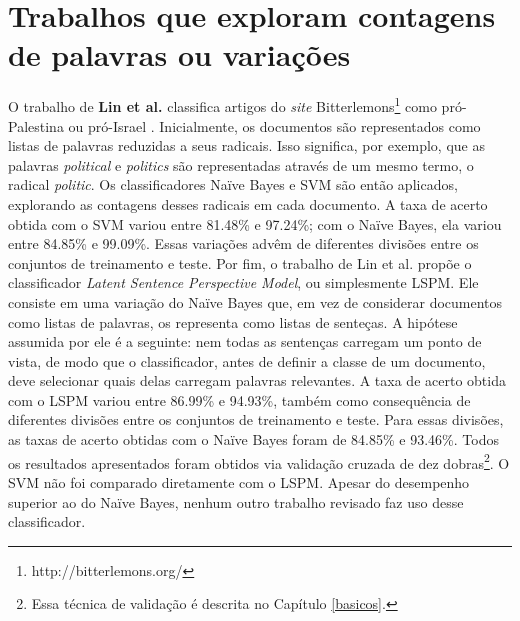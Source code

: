



\section{Trabalhos que exploram contagens de palavras ou variações}
\label{contagem}

O trabalho de \textbf{Lin et al.} classifica artigos do \emph{site} Bitterlemons\footnote{http://bitterlemons.org/} como pró-Palestina ou pró-Israel \cite{lin-et-al2006}. Inicialmente, os documentos são representados como listas de palavras reduzidas a seus radicais. Isso significa, por exemplo, que as palavras \emph{political} e \emph{politics} são representadas através de um mesmo termo, o radical \emph{politic}. Os classificadores Naïve Bayes e SVM são então aplicados, explorando as contagens desses radicais em cada documento. A taxa de acerto obtida com o SVM variou entre 81.48\% e 97.24\%; com o Naïve Bayes, ela variou entre 84.85\% e 99.09\%. Essas variações advêm de diferentes divisões entre os conjuntos de treinamento e teste. Por fim, o trabalho de Lin et al. propõe o classificador \emph{Latent Sentence Perspective Model}, ou simplesmente LSPM. Ele consiste em uma variação do Naïve Bayes que, em vez de considerar documentos como listas de palavras, os representa como listas de senteças. A hipótese assumida por ele é a seguinte: nem todas as sentenças carregam um ponto de vista, de modo que o classificador, antes de definir a classe de um documento, deve selecionar quais delas carregam palavras relevantes. A taxa de acerto obtida com o LSPM variou entre  86.99\% e 94.93\%, também como consequência de diferentes divisões entre os conjuntos de treinamento e teste. Para essas divisões, as taxas de acerto obtidas com o Naïve Bayes foram de 84.85\% e 93.46\%. Todos os resultados apresentados foram obtidos via validação cruzada de dez dobras\footnote{Essa técnica de validação é descrita no Capítulo \ref{basicos}.}. O SVM não foi comparado diretamente com o LSPM. Apesar do desempenho superior ao do Naïve Bayes, nenhum outro trabalho revisado faz uso desse classificador. 

